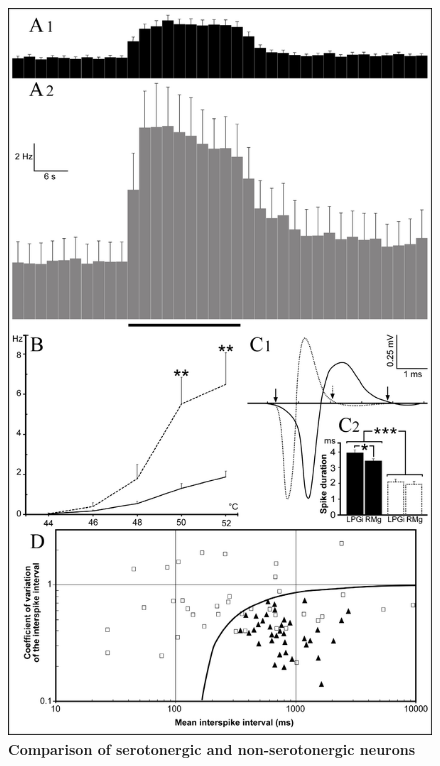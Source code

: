 \documentclass[a4paper,12pt,twoside]{report}
\begin{document}
\begin{figure}[p]

\begin{center}
 \includegraphics[scale=0.65]{Article3-FIG6.jpg} 
\end{center}
\caption{\textbf{Comparison of serotonergic and non-serotonergic neurons}}


\end{figure}
\end{document}
